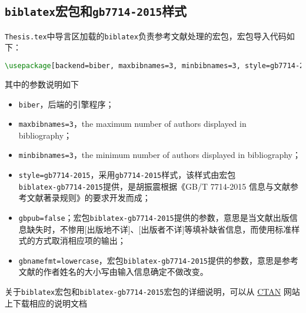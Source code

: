 \subsection{\texttt{biblatex}宏包和\texttt{gb7714-2015}样式}
\par \texttt{Thesis.tex}中导言区加载的\texttt{biblatex}负责参考文献处理的宏包，宏包导入代码如下：
\begin{lstlisting}[language=TeX]
\usepackage[backend=biber, maxbibnames=3, minbibnames=3, style=gb7714-2015, gbpub=false, gbnamefmt=lowercase]{biblatex}
\end{lstlisting}
其中的参数说明如下
\begin{itemize}
\item \texttt{biber}，后端的引擎程序；
\item \texttt{maxbibnames=3}，the maximum number of authors displayed in bibliography；
\item \texttt{minbibnames=3}，the minimum number of authors displayed in bibliography；
\item \texttt{style=gb7714-2015}，采用\texttt{gb7714-2015}样式，该样式由宏包 \\ \texttt{biblatex-gb7714-2015}提供，是胡振震根据《GB/T 7714-2015 信息与文献参考文献著录规则》的要求开发而成；
\item \texttt{gbpub=false}；宏包\texttt{biblatex-gb7714-2015}提供的参数，意思是当文献出版信息缺失时，不惨用[出版地不详]、[出版者不详]等填补缺省信息，而使用标准样式的方式取消相应项的输出；
\item \texttt{gbnamefmt=lowercase}，宏包\texttt{biblatex-gb7714-2015}提供的参数，意思是参考文献的作者姓名的大小写由输入信息确定不做改变。
\end{itemize}



关于\texttt{biblatex}宏包和\texttt{biblatex-gb7714-2015}宏包的详细说明，可以从 \href{https://ctan.org/?lang=en}{CTAN} 网站上下载相应的说明文档


